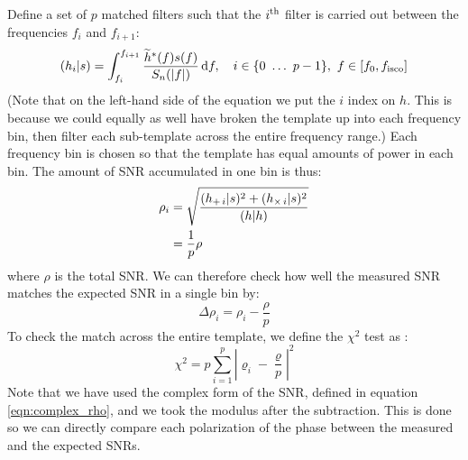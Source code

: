 Define a set of $p$ matched filters such that the $i^{\mathrm{th}}$ filter is carried out between the frequencies $f_i$ and $f_{i+1}$:
\begin{equation}
(h_i|s) = \int_{f_i}^{f_{i+1}} \frac{ \widetilde{h}^{*}(f) s(f) }{S_n(|f|)} \,\mathrm{d} f, \quad i \in \{0~ \ldots~ p-1\},~ f \in \left[ f_0, f_{\mathrm{isco}} \right]
\end{equation}
(Note that on the left-hand side of the equation we put the $i$ index on $h$. This is because we could equally as well have broken the template up into each frequency bin, then filter each sub-template across the entire frequency range.) Each frequency bin is chosen so that the template has equal amounts of power in each bin. The amount of \ac{SNR} accumulated in one bin is thus:
\begin{align}
\rho_i &= \sqrt{\frac{(h_{+ \,i}|s)^2 + (h_{\times \,i}|s)^2}{(h|h)}} \nonumber \\
 &= \frac{1}{p} \rho
\end{align}
where $\rho$ is the total \ac{SNR}. We can therefore check how well the measured \ac{SNR} matches the expected \ac{SNR} in a single bin by:
\begin{equation*}
\Delta \rho_i = \rho_i - \frac{\rho}{p}
\end{equation*}
To check the match across the entire template, we define the $\chi^2$ test as \cite{ref:Allen}:
\begin{equation}
\label{eqn:basic_chisq}
\chi^2 = p \sum_{i=1}^{p} \left|\varrho_i - \frac{\varrho}{p}\right|^2
\end{equation}
Note that we have used the complex form of the \ac{SNR}, defined in equation \ref{eqn:complex_rho}, and we took the modulus after the subtraction. This is done so we can directly compare each polarization of the phase between the measured and the expected \acp{SNR}.

